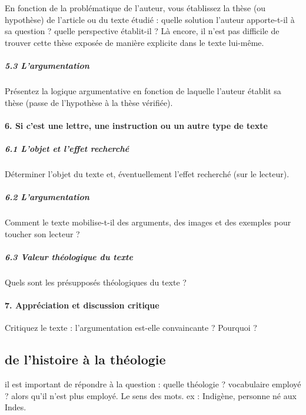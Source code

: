 En fonction de la problématique de l’auteur, vous établissez la thèse (ou hypothèse) de l’article ou du texte étudié : quelle solution l’auteur apporte-t-il à sa question ? quelle perspective établit-il ? Là encore, il n’est pas difficile de trouver cette thèse exposée de manière explicite dans le texte lui-même. 

\subparagraph{5.3	 L’argumentation }


Présentez la logique argumentative en fonction de laquelle l’auteur établit sa thèse (passe de l’hypothèse à la thèse vérifiée).

\paragraph{6.	Si c’est une lettre, une instruction ou un autre type de texte}

\subparagraph{	6.1 L’objet et l’effet recherché}

Déterminer l’objet du texte et, éventuellement l’effet recherché (sur le lecteur).

\subparagraph{6.2	 L’argumentation}

Comment le texte mobilise-t-il des arguments, des images et des exemples pour toucher son lecteur ?

\subparagraph{6.3	 Valeur théologique du texte}

Quels sont les présupposés théologiques du texte ?


\paragraph{7.  Appréciation et discussion critique }

Critiquez le texte : l’argumentation est-elle convaincante ? Pourquoi ?


\subsection{de l'histoire à la théologie}
il est important de répondre à la question : quelle théologie ? vocabulaire employé ? alors qu'il n'est plus employé. Le sens des mots. ex :  Indigène, personne né aux Indes.

